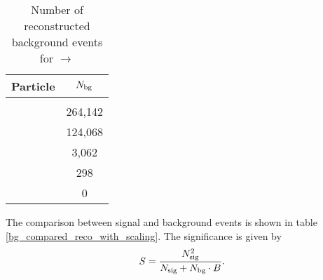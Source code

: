 \begin{table}
	\centering
	\caption{Number of reconstructed background events for \pbarpSystem $\rightarrow$ \excitedcascade \anticascade }
	\label{tab:bg_reco_without_scaling}
	\begin{tabular}{lc}
		\hline
		Particle & $N_{\textnormal{bg}}$ \\
		\hline
		\hline
		&\\
		\lam & 264,142\\
		\alam & 124,068\\
		\anticascade & 3,062\\
		\excitedcascade & 298\\
		\excitedcascade \anticascade & 0\\
		\hline
		 
		  
	\end{tabular}
\end{table}
The comparison between signal and background events is shown in table \ref{bg_compared_reco_with_scaling}.
The significance is given by
\begin{equation}
	S = \frac{N^{2}_{\textnormal{sig}}}{N_{\textnormal{sig}}+N_{\textnormal{bg}}\cdot B}.
	\label{eq:significance}
\end{equation}

